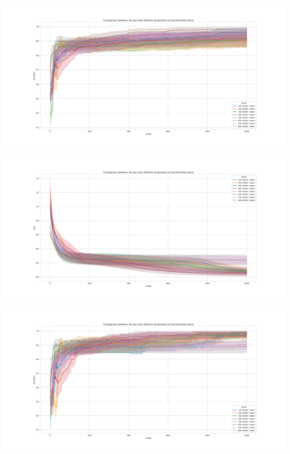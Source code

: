 \documentclass{article} %
\begin{document}
\begin{figure}[!ht]
    \centering
        \includegraphics[width=0.95\textwidth, keepaspectratio]{images/accuracy_red_TL2.png}
    \caption{}
    \label{fig9}
\end{figure}
\begin{figure}[!ht]
    \centering
        \includegraphics[width=0.95\textwidth, keepaspectratio]{images/loss_red_TL1.png}
    \caption{}
    \label{fig10}
\end{figure}
\begin{figure}[!ht]
    \centering
        \includegraphics[width=0.95\textwidth, keepaspectratio]{images/accuracy_red_TL1.png}
    \caption{}
    \label{fig11}
\end{figure}








\newpage
\renewcommand\thefigure{\thesection.\arabic{figure}}
\end{document}
